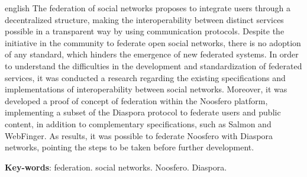 \begin{resumo}[Abstract]
  \begin{otherlanguage*}{english}
    The federation of social networks proposes to integrate users through a
    decentralized structure, making the interoperability between distinct services
    possible in a transparent way by using communication protocols. Despite the
    initiative in the community to federate open social networks, there is no
    adoption of any standard, which hinders the emergence of new federated systems.
    In order to understand the difficulties in the development and standardization
    of federated services, it was conducted a research regarding the existing
    specifications and implementations of interoperability between social networks.
    Moreover, it was developed a proof of concept of federation within the Noosfero
    platform, implementing a subset of the Diaspora protocol to federate users and
    public content, in addition to complementary specifications, such as Salmon and
    WebFinger. As results, it was possible to federate Noosfero with Diaspora
    networks, pointing the steps to be taken before further development.

    \vspace{\onelineskip}

    \noindent
    \textbf{Key-words}: federation. social networks. Noosfero. Diaspora.
  \end{otherlanguage*}
\end{resumo}
